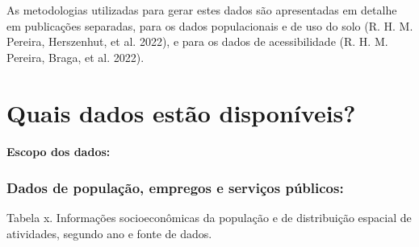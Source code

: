 \documentclass[
  letterpaper,
  DIV=11,
  numbers=noendperiod]{scrreprt}
\begin{document}
\begin{tcolorbox}[enhanced jigsaw, arc=.35mm, breakable, left=2mm, rightrule=.15mm, colback=white, leftrule=.75mm, bottomrule=.15mm, opacityback=0, toprule=.15mm, colframe=quarto-callout-note-color-frame]
\begin{minipage}[t]{5.5mm}
\textcolor{quarto-callout-note-color}{\faInfo}
\end{minipage}%
\begin{minipage}[t]{\textwidth - 5.5mm}
As metodologias utilizadas para gerar estes dados são apresentadas em
detalhe em publicações separadas, para os dados populacionais e de uso
do solo (R. H. M. Pereira, Herszenhut, et al. 2022), e para os dados de
acessibilidade (R. H. M. Pereira, Braga, et al. 2022).\end{minipage}%
\end{tcolorbox}

\part{Quais dados estão disponíveis?}

\hypertarget{escopo-dos-dados}{%
\subsection*{Escopo dos dados:}\label{escopo-dos-dados}}

\hypertarget{dados-de-populauxe7uxe3o-empregos-e-serviuxe7os-puxfablicos}{%
\section*{Dados de população, empregos e serviços
públicos:}\label{dados-de-populauxe7uxe3o-empregos-e-serviuxe7os-puxfablicos}}

Tabela x. Informações socioeconômicas da população e de distribuição
espacial de atividades, segundo ano e fonte de dados.
\end{document}
